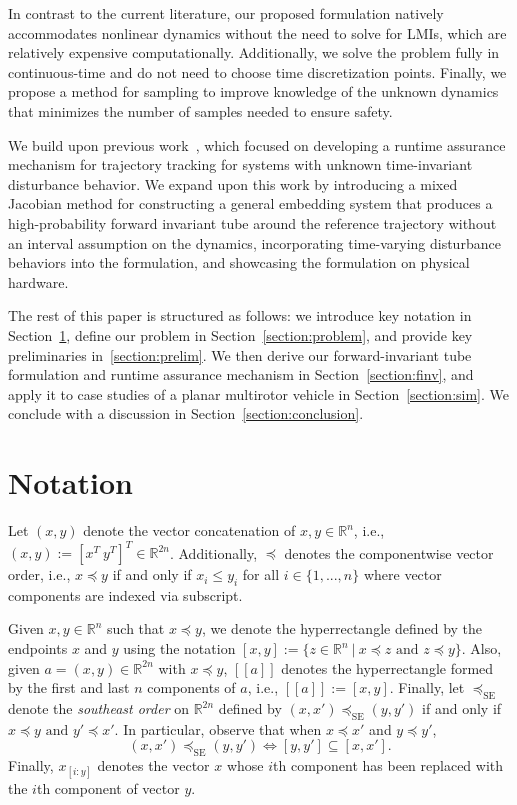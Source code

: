 \documentclass[preprint,12pt]{elsarticle}
\begin{document}
In contrast to the current literature, our proposed formulation natively accommodates nonlinear dynamics without the need to solve for LMIs, which are relatively expensive computationally. Additionally, we solve the problem fully in continuous-time and do not need to choose time discretization points. Finally, we propose a method for sampling to improve knowledge of the unknown dynamics that minimizes the number of samples needed to ensure safety.

We build upon previous work~\cite{caoICRARTA}, which focused on developing a runtime assurance mechanism for trajectory tracking for systems with unknown time-invariant disturbance behavior. We expand upon this work by introducing a mixed Jacobian method for constructing a general embedding system that produces a high-probability forward invariant tube around the reference trajectory without an interval assumption on the dynamics, incorporating time-varying disturbance behaviors into the formulation, and showcasing the formulation on physical hardware.

The rest of this paper is structured as follows: 
we introduce key notation in Section~\ref{section:notation}, define our problem in Section~\ref{section:problem}, and provide key preliminaries in~\ref{section:prelim}. We then derive our forward-invariant tube formulation and runtime assurance mechanism in Section~\ref{section:finv}, and apply it to case studies of a planar multirotor vehicle in Section~\ref{section:sim}. We conclude with a discussion in Section~\ref{section:conclusion}.

\section{Notation}
\label{section:notation}
Let $(x, y)$ denote the vector concatenation of $x, y \in \mathbb{R}^n$, i.e., $(x, y) := [x^T\ y^T]^T \in \mathbb{R}^{2n}$. Additionally, $\preceq$ denotes the componentwise vector order, i.e., $x\preceq y$ if and only if $x_i \leq y_i$ for all $i\in\{1, ..., n\}$ where vector components are indexed via subscript.

Given $x,y \in \mathbb{R}^n$ such that $x\preceq y$, we denote the hyperrectangle defined by the endpoints $x$ and $y$ using the notation
 $   [x, y]:=\{z\in\mathbb{R}^n\ |\ x\preceq z\text{ and }z\preceq y\}.
 $ 
Also, given $a = (x, y)\in\mathbb{R}^{2n}$ with $x\preceq y$, $[\![a]\!]$ denotes the hyperrectangle formed by the first and last $n$ components of $a$, i.e., $[\![a]\!] := [x, y]$. Finally, let $\preceq_\text{SE}$ denote the \textit{southeast order} on $\mathbb{R}^{2n}$ defined by $(x, x')\preceq_\text{SE}(y, y')$ if and only if $x\preceq y \text{ and } y'\preceq x'$. In particular, observe that when $x\preceq x'$ and $y\preceq y'$, 
\begin{equation}
\label{eq:box}
    (x, x')\preceq_\text{SE}(y, y') \iff [y, y']\subseteq[x, x'].
\end{equation}
Finally, $x_{[i:y]}$ denotes the vector $x$ whose $i$th component has been replaced with the $i$th component of vector $y$.
\end{document}
